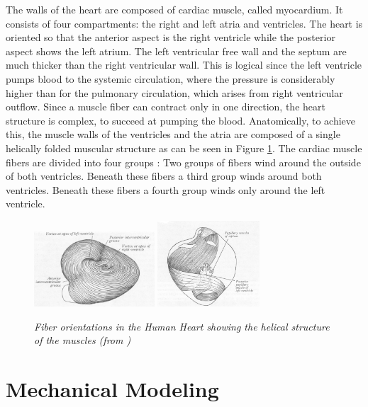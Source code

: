The walls of the heart are composed of cardiac muscle, called myocardium. It consists of four compartments: the right and left atria and ventricles. The heart is oriented so that the anterior aspect is the right ventricle while the posterior aspect shows the left atrium. The left ventricular free wall and the septum are much thicker than the right ventricular wall. This is logical since the left ventricle pumps blood to the systemic circulation, where the pressure is considerably higher than for the pulmonary circulation, which arises from right ventricular outflow. Since a muscle fiber can contract only in one direction, the heart structure is complex, to succeed at pumping the blood. Anatomically, to achieve this, the muscle walls of the ventricles and the atria are composed of a single helically folded muscular structure as can be seen in Figure \ref{grays_1}. The cardiac muscle fibers are divided into four groups \cite{gray18}: Two groups of fibers wind around the outside of both ventricles. Beneath these fibers a third group winds around both ventricles. Beneath these fibers a fourth group winds only around the left ventricle. 

\begin{figure}[!hbtp]
\begin{center}
\includegraphics[width=0.4\textwidth]{images/grays_3}
\includegraphics[width=0.34\textwidth]{images/grays_2} 
\caption{\em \small Fiber orientations in the Human Heart showing the helical structure of the muscles (from \cite{gray18})}
\label{grays_1}
\end{center}  
\end{figure} 

\section{Mechanical Modeling}

